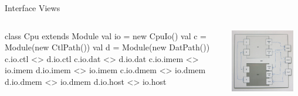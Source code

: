 \documentclass[xcolor=pdflatex,dvipsnames,table]{beamer}
\begin{document}
\begin{frame}[fragile]{Interface Views}
\begin{columns}

\begin{scala}
class Cpu extends Module {
  val io = new CpuIo()
  val c  = Module(new CtlPath())
  val d  = Module(new DatPath())
  c.io.ctl  <> d.io.ctl
  c.io.dat  <> d.io.dat
  c.io.imem <> io.imem
  d.io.imem <> io.imem
  c.io.dmem <> io.dmem
  d.io.dmem <> io.dmem
  d.io.host <> io.host
}
\end{scala}


\begin{center}
\includegraphics[width=0.9\textwidth]{../tutorial/figs/cpu.png} 
\end{center}

\end{columns}
\end{frame}
\end{document}
